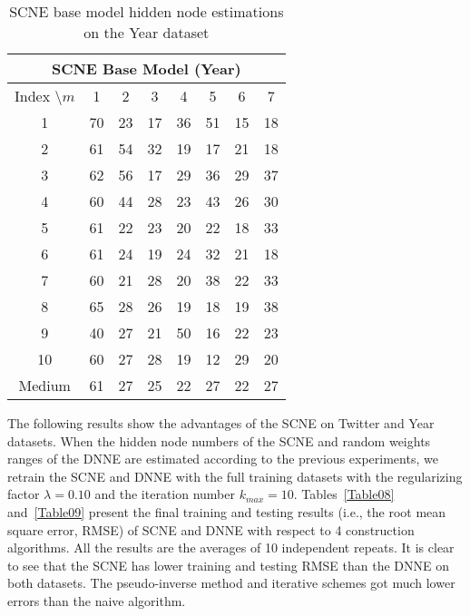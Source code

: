 \documentclass{article}
\begin{document}
\begin{table}[H]
\footnotesize 
\centering
\caption{SCNE base model hidden node estimations on the Year dataset}
\label{Table_SCNE2}
\begin{tabular}{c|ccccccc}\hline
 \multicolumn{8}{c}{SCNE Base Model (Year)} \\ \hline
\multicolumn{1}{c|}{Index $\setminus m$} & \multicolumn{1}{c}{1} & \multicolumn{1}{c}{2} & \multicolumn{1}{c}{3} & \multicolumn{1}{c}{4} & \multicolumn{1}{c}{5} & \multicolumn{1}{c}{6} & \multicolumn{1}{c}{7} \\ \hline
1       & 70 & 23 & 17   & 36  & 51 & 15 & 18    \\
2       & 61 & 54 & 32   & 19  & 17 & 21 & 18    \\
3       & 62 & 56 & 17   & 29  & 36 & 29 & 37    \\
4       & 60 & 44 & 28   & 23  & 43 & 26 & 30    \\
5       & 61 & 22 & 23   & 20  & 22 & 18 & 33    \\
6       & 61 & 24 & 19   & 24  & 32 & 21 & 18    \\
7       & 60 & 21 & 28   & 20  & 38 & 22 & 33    \\
8       & 65 & 28 & 26   & 19  & 18 & 19 & 38    \\
9       & 40 & 27 & 21   & 50  & 16 & 22 & 23    \\
10      & 60 & 27 & 28   & 19  & 12 & 29 & 20    \\ \hline
Medium  & 61 & 27 & 25   & 22  & 27 & 22 & 27    \\ \hline
\end{tabular}
\end{table}
The following results show the advantages of the SCNE on Twitter and Year datasets.
When the hidden node numbers of the SCNE and random weights ranges of the DNNE are estimated according to the previous experiments, we retrain the SCNE and DNNE with the full training datasets with the regularizing factor $\lambda = 0.10$ and the iteration number $k_{max} = 10$. 
Tables~\ref{Table08} and~\ref{Table09} present the final training and testing results (i.e., the root mean square error, RMSE) of SCNE and DNNE with respect to 4 construction algorithms. 
All the results are the averages of 10 independent repeats.
It is clear to see that the SCNE has lower training and testing RMSE than the DNNE on both datasets.
The pseudo-inverse method and iterative schemes got much lower errors than the naive algorithm. 
\end{document}
